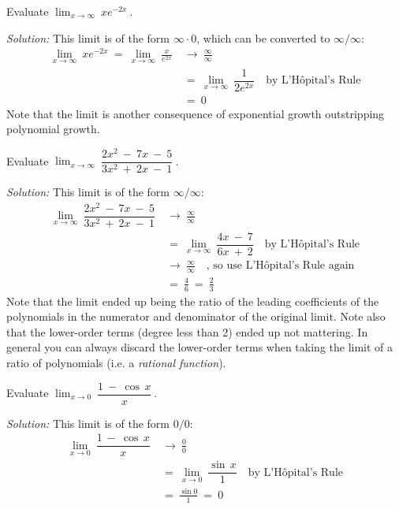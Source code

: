 \begin{exmp}\label{exmp:limzeroinf}
\noindent Evaluate $\displaystyle\lim_{x \to \infty}~x e^{-2x}~$.\vspace{1mm}
\par\noindent\emph{Solution:} This limit is of the form $\infty \cdot 0$, which
can be converted to $\infty/\infty$:
\begin{align*}
\lim_{x \to \infty}~x e^{-2x} ~=~ \lim_{x \to \infty}~\frac{x}{e^{2x}} ~&\to~ \frac{\infty}{\infty}\\
&=~ \lim_{x \to \infty}~\dfrac{1}{2e^{2x}} \quad\text{by L'H\^{o}pital's Rule}\\
&=~ 0
\end{align*}
Note that the limit is another consequence of exponential growth outstripping
polynomial growth.
\end{exmp}
\begin{exmp}\label{exmp:limratpoly}
\noindent Evaluate $\displaystyle\lim_{x \to \infty}~\dfrac{2x^2 ~-~ 7x ~-~ 5}{3x^2 ~+~ 2x ~-~ 1}~$.\vspace{1mm}
\par\noindent\emph{Solution:} This limit is of the form $\infty/\infty$:
\begin{align*}
\lim_{x \to \infty}~\dfrac{2x^2 ~-~ 7x ~-~ 5}{3x^2 ~+~ 2x ~-~ 1} ~&\to~ \frac{\infty}{\infty}\\[4pt]
&=~ \lim_{x \to \infty}~\dfrac{4x ~-~ 7}{6x ~+~ 2} \quad\text{by L'H\^{o}pital's Rule}\\[6pt]
~&\to~ \frac{\infty}{\infty} \quad\text{, so use L'H\^{o}pital's Rule again}\\[6pt]
&=~ \frac{4}{6} ~=~ \frac{2}{3}
\end{align*}
Note that the limit ended up being the ratio of the leading coefficients of the
polynomials in the numerator and denominator of the original limit. Note also
that the lower-order terms (degree less than 2) ended up not mattering. In
general you can always discard the lower-order terms when taking the limit of a
ratio of polynomials (i.e. a
\emph{rational function}).
\end{exmp}
\divider
\newpage
\begin{exmp}\label{exmp:lim1minuscos}
\noindent Evaluate $\displaystyle\lim_{x \to 0}~\dfrac{1 ~-~ \cos\,x}{x}~$.\vspace{1mm}
\par\noindent\emph{Solution:} This limit is of the form $0/0$:
\begin{align*}
\lim_{x \to 0}~\dfrac{1 ~-~ \cos\,x}{x} ~&\to~ \frac{0}{0}\\[4pt]
&=~ \lim_{x \to 0}~\dfrac{\sin\,x}{1} \quad\text{by L'H\^{o}pital's Rule}\\[6pt]
&=~ \frac{\sin 0}{1} ~=~ 0
\end{align*}
\end{exmp}
\divider
\vspace{3mm}

